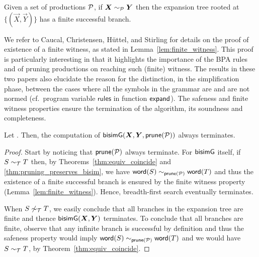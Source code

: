 \begin{lemma} 
\label{lem:finite_witness}
	Given a set of productions $\mathcal P$,
	if $\vec X \ProdEquiv \vec Y$ then the expansion tree rooted at
	$\{(\vec X, \vec Y)\}$ has a finite successful branch.
\end{lemma}

We refer to Caucal, Christensen, H{\"{u}}ttel, and Stirling for
details on the proof of existence of a finite witness, as stated in
Lemma~\ref{lem:finite_witness}. This proof is particularly interesting
in that it highlights the importance of the BPA rules and of pruning
productions on reaching such (finite) witness. The results in these
two papers also elucidate the reason for the distinction, in the
simplification phase, between the cases where all the symbols in the
grammar are and are not normed (cf.~program variable $\mathsf{rules}$
in function $\mathsf{expand}$).
%
The safeness and finite witness properties ensure the termination of
the algorithm, its soundness and completeness.

\begin{lemma}[Termination]
  \label{lem:termination}
  Let \grmcontext. Then, the computation of $\Bisim(\vec X,\vec Y, \Prune(\productions))$
  always terminates.
\end{lemma}
%
\begin{proof}
  Start by noticing that $\mathsf{prune}(\mathcal P)$ always terminate.
  For $\mathsf{bisimG}$ itself, if $S\sim_\mathcal T T$ then, by
  Theorems~\ref{thm:equiv_coincide} and
  \ref{thm:pruning_preserves_bisim}, we have
  $\mathsf{word}(S) \sim_{\mathsf{prune}(\mathcal P)} \mathsf{word}(T) $ and thus the
  existence of a finite successful branch is ensured by the finite
  witness property (Lemma~\ref{lem:finite_witness}).  Hence,
  breadth-first search eventually terminates.
  
  When $S\not\sim_\mathcal T T$, we easily conclude that all branches in
  the expansion tree are finite and thence $\Bisim(\vec X,\vec Y)$
  terminates.  To conclude that all branches are finite, observe that
  any infinite branch is successful by definition and thus the
  safeness property would imply $\mathsf{word}(S) \sim_{\mathsf{prune}(\mathcal P)} \mathsf{word}(T)$ 
  and we would have
  $S\sim_\mathcal T T$, by Theorem~\ref{thm:equiv_coincide}.
\end{proof}


